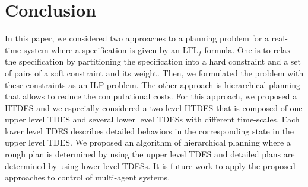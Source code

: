 \documentclass{article}
\begin{document}
\section{Conclusion}
%

In this paper, we considered two approaches to a planning problem for a real-time system where a specification is given by an LTL$_f$ formula.
One is to relax the specification by partitioning the specification into a hard constraint and a set of pairs of a  soft constraint and its weight. 
Then, we formulated the problem with these constraints as an ILP problem.
The other approach is hierarchical planning that allows to reduce the computational costs.
For this approach, we proposed a HTDES and we especially considered a two-level HTDES that is composed of one upper level TDES and several lower level TDESs with different time-scales.
Each lower level TDES describes detailed behaviors in the corresponding state in the upper level TDES.
We proposed an algorithm of hierarchical planning where a rough plan is determined by using the upper level TDES and detailed plans are determined by using lower level TDESs.
%
It is future work to apply the proposed approaches to control of multi-agent systems.
%
%
%
%
\end{document}
